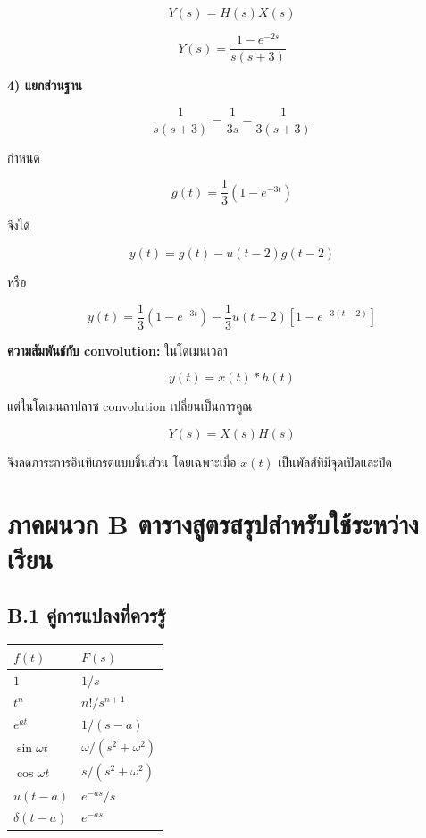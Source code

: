 \[
Y(s)=H(s)X(s)
\]

\[
\boxed{Y(s)=\frac{1-e^{-2s}}{s(s+3)}}
\]

\textbf{4) แยกส่วนฐาน}

\[
\frac{1}{s(s+3)}=\frac{1}{3s}-\frac{1}{3(s+3)}
\]

กำหนด

\[
g(t)=\frac{1}{3}(1-e^{-3t})
\]

จึงได้

\[
\boxed{y(t)=g(t)-u(t-2)g(t-2)}
\]

หรือ

\[
\boxed{y(t)=\frac{1}{3}(1-e^{-3t}) -\frac{1}{3}u(t-2)\left[1-e^{-3(t-2)}\right]}
\]

\textbf{ความสัมพันธ์กับ convolution:} ในโดเมนเวลา

\[
y(t)=x(t)*h(t)
\]

แต่ในโดเมนลาปลาซ convolution เปลี่ยนเป็นการคูณ

\[
Y(s)=X(s)H(s)
\]

จึงลดภาระการอินทิเกรตแบบชิ้นส่วน โดยเฉพาะเมื่อ $x(t)$ เป็นพัลส์ที่มีจุดเปิดและปิด



\section{ภาคผนวก B ตารางสูตรสรุปสำหรับใช้ระหว่างเรียน}

\subsection{B.1 คู่การแปลงที่ควรรู้}

\begin{table}[htbp]
    \centering
    \begin{tabular}{l l}
        \hline
        \textbf{$f(t)$} & \textbf{$F(s)$} \\
        \hline
        $1$ & $1/s$ \\
        $t^n$ & $n!/s^{n+1}$ \\
        $e^{at}$ & $1/(s-a)$ \\
        $\sin\omega t$ & $\omega/(s^2+\omega^2)$ \\
        $\cos\omega t$ & $s/(s^2+\omega^2)$ \\
        $u(t-a)$ & $e^{-as}/s$ \\
        $\delta(t-a)$ & $e^{-as}$ \\
        \hline
    \end{tabular}
\end{table}

